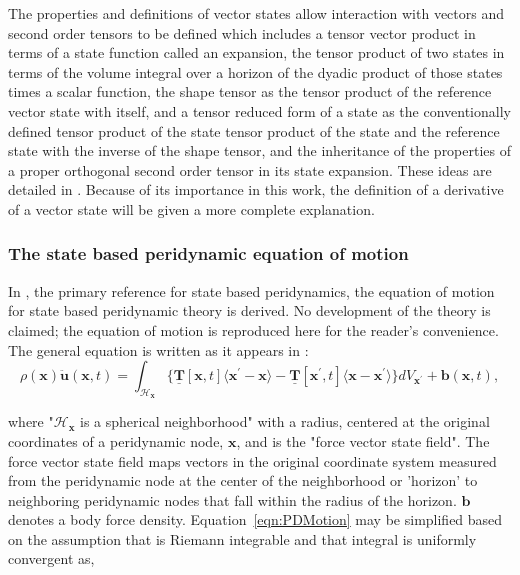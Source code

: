 \documentclass[preprint,12pt]{elsarticle}
\begin{document}
%
The properties and definitions of vector states allow interaction with vectors
and second order tensors to be defined which includes a tensor vector product
in terms of a state function called an expansion, the tensor product of two states in terms of the
volume integral over a horizon of the dyadic product of those states times a
scalar function, the shape tensor as the tensor product of the reference vector
state with itself, and a tensor reduced form of a state as the conventionally
defined tensor product of the state tensor product of the state and the
reference state with the inverse of the shape tensor, and the inheritance of
the properties of a proper orthogonal second order tensor in its state
expansion. These ideas are detailed in \cite{silling:psa}. 
%
Because of its importance in this work, the definition of a derivative of a vector state
will be given a more complete explanation.



\subsubsection{The state based peridynamic equation of motion}

In \cite{silling:psa}, the primary reference for state based peridynamics, the
equation of motion for state based peridynamic theory is derived. No
development of the theory is claimed; the equation of motion is reproduced here for the reader's convenience.
%
The general equation is written as it appears in \cite{silling:psa}:
\begin{equation} 
    \label{eqn:PDMotion}
    \rho(\boldsymbol{x})\boldsymbol{\ddot{u}}(\boldsymbol{x}, t) = \int_{\mathcal{H}_{\boldsymbol{x}}} \{\boldsymbol{\underline{T}}[\boldsymbol{x}, t]\langle \boldsymbol{x}^{\prime} - \boldsymbol{x} \rangle - \boldsymbol{\underline{T}}[\boldsymbol{x}^{\prime}, t]\langle \boldsymbol{x} - \boldsymbol{x}^{\prime} \rangle \}dV_{\boldsymbol{x}^{\prime}} + \boldsymbol{b}(\boldsymbol{x}, t),
\end{equation} 

where "$\mathcal{H}_{\boldsymbol{x}}$ is a spherical neighborhood" with a
radius, centered at the original coordinates of a peridynamic node,
$\boldsymbol{x}$, and  is the "force vector state
field". The force vector state field maps vectors in the original coordinate system 
measured from the peridynamic node at the center of the neighborhood or 'horizon' to
neighboring peridynamic nodes that fall within the radius of the horizon. $\boldsymbol{b}$ denotes a body force density. Equation~\ref{eqn:PDMotion} may be simplified based on the assumption that
 is Riemann integrable and that integral is uniformly
convergent \cite{silling:psa} as,
\end{document}
